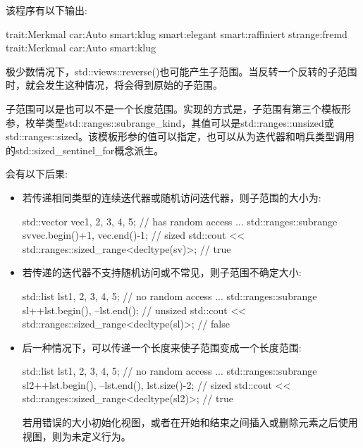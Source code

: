 该程序有以下输出:

\begin{shell}
trait:Merkmal car:Auto smart:klug smart:elegant smart:raffiniert strange:fremd
trait:Merkmal car:Auto smart:klug
\end{shell}

极少数情况下，std::views::reverse()也可能产生子范围。当反转一个反转的子范围时，就会发生这种情况，将会得到原始的子范围。



子范围可以是也可以不是一个长度范围。实现的方式是，子范围有第三个模板形参，枚举类型std::ranges::subrange\_kind，其值可以是std::ranges::unsized或std::ranges::sized。该模板形参的值可以指定，也可以从为迭代器和哨兵类型调用的std::sized\_sentinel\_for概念派生。

会有以下后果:

\begin{itemize}
\item
若传递相同类型的连续迭代器或随机访问迭代器，则子范围的大小为:

\begin{cpp}
std::vector vec{1, 2, 3, 4, 5}; // has random access
...
std::ranges::subrange sv{vec.begin()+1, vec.end()-1}; // sized
std::cout << std::ranges::sized_range<decltype(sv)>; // true
\end{cpp}

\item
若传递的迭代器不支持随机访问或不常见，则子范围不确定大小:

\begin{cpp}
std::list lst{1, 2, 3, 4, 5}; // no random access
...
std::ranges::subrange sl{++lst.begin(), --lst.end()}; // unsized
std::cout << std::ranges::sized_range<decltype(sl)>; // false
\end{cpp}

\item
后一种情况下，可以传递一个长度来使子范围变成一个长度范围:

\begin{cpp}
std::list lst{1, 2, 3, 4, 5}; // no random access
...
std::ranges::subrange sl2{++lst.begin(), --lst.end(), lst.size()-2}; // sized
std::cout << std::ranges::sized_range<decltype(sl2)>; // true
\end{cpp}

若用错误的大小初始化视图，或者在开始和结束之间插入或删除元素之后使用视图，则为未定义行为。
\end{itemize}



